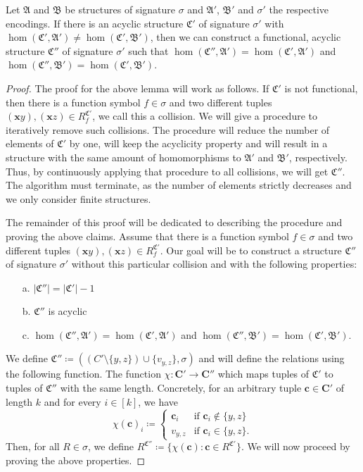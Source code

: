 \begin{lemma}
	Let $\mathfrak A$ and $\mathfrak B$ be structures of signature $\sigma$ and $\mathfrak A'$, $\mathfrak B'$ and $\sigma'$ the respective encodings.
	If there is an acyclic structure $\mathfrak C'$ of signature $\sigma'$ with $\hom(\mathfrak C',\mathfrak A')\neq\hom(\mathfrak C',\mathfrak B')$, then we can construct a functional, acyclic structure $\mathfrak C''$ of signature $\sigma'$ such that $\hom(\mathfrak C'',\mathfrak A')=\hom(\mathfrak C',\mathfrak A')$ and $\hom(\mathfrak C'',\mathfrak B')=\hom(\mathfrak C',\mathfrak B')$.
	\label{lem:constructionOfFunctionalStruct}
\end{lemma}
\begin{proof}
	The proof for the above lemma will work as follows.
	If $\mathfrak C'$ is not functional, then there is a function symbol $f\in\sigma$ and two different tuples $(\mathbf xy),(\mathbf xz)\in R^{\mathfrak C'}_f$, we call this a collision.
	We will give a procedure to iteratively remove such collisions.
	The procedure will reduce the number of elements of $\mathfrak C'$ by one, will keep the acyclicity property and will result in a structure with the same amount of homomorphisms to $\mathfrak A'$ and $\mathfrak B'$, respectively.
	Thus, by continuously applying that procedure to all collisions, we will get $\mathfrak C''$.
	The algorithm must terminate, as the number of elements strictly decreases and we only consider finite structures.
	
	The remainder of this proof will be dedicated to describing the procedure and proving the above claims.
	Assume that there is a function symbol $f\in \sigma$ and two different tuples $(\mathbf x y),(\mathbf x z)\in R_f^{\mathfrak C'}$. 
	Our goal will be to construct a structure $\mathfrak C''$ of signature $\sigma'$ without this particular collision and with the following properties:
	\begin{itemize}
		\item[a.] $\vert \mathfrak C'' \vert = \vert \mathfrak C'\vert -1$
		\item[b.] $\mathfrak C''$ is acyclic
		\item[c.] $\hom(\mathfrak C'',\mathfrak A')=\hom(\mathfrak C',\mathfrak A')$ and $\hom(\mathfrak C'',\mathfrak B')=\hom(\mathfrak C',\mathfrak B')$.
	\end{itemize}
	We define $\mathfrak C'' \coloneqq ((C' \setminus \{y,z\})\cup \{v_{y,z}\}, \sigma)$ and will define the relations using the following function.
	The function $\chi : \mathbf{C'}\to\mathbf{C''}$ which maps tuples of $\mathfrak C'$ to tuples of $\mathfrak C''$ with the same length.
	Concretely, for an arbitrary tuple $\mathbf c\in \mathbf{C'}$ of length $k$ and for every $i\in[k]$, we have
	$$\chi(\mathbf c)_i \coloneqq \begin{cases}
		\mathbf c_i & \text{if } \mathbf c_i\notin \{y,z\} \\
		v_{y,z} & \text{if } \mathbf c_i \in \{y,z\}.
	\end{cases}$$
	Then, for all $R\in\sigma$, we define $R^{\mathfrak C''}\coloneqq \{\chi(\mathbf c) : \mathbf c\in R^{\mathfrak C'}\}$.
	We will now proceed by proving the above properties.
	

\end{proof}
